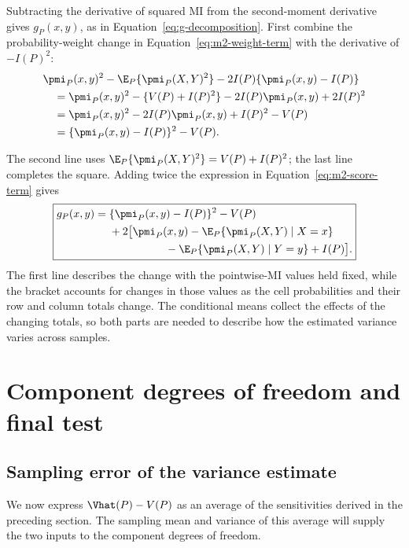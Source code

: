 Subtracting the derivative of squared MI from the second-moment derivative
gives \(g_P(x,y)\), as in Equation~\eqref{eq:g-decomposition}.
First combine the probability-weight change in
Equation~\eqref{eq:m2-weight-term} with the derivative of \(-I(P)^2\):
\begin{align*}
 &\pmi_P(x,y)^2-\E_P\{\pmi_P(X,Y)^2\}
       -2I(P)\{\pmi_P(x,y)-I(P)\}\\*
 &\quad=\pmi_P(x,y)^2-\{V(P)+I(P)^2\}
       -2I(P)\pmi_P(x,y)+2I(P)^2\\*
 &\quad=\pmi_P(x,y)^2-2I(P)\pmi_P(x,y)+I(P)^2-V(P)\\*
 &\quad=\{\pmi_P(x,y)-I(P)\}^2-V(P).
\end{align*}
\begin{samepage}%
The second line uses
\(\E_P\{\pmi_P(X,Y)^2\}=V(P)+I(P)^2\); the last line completes the
square. Adding twice the expression in Equation~\eqref{eq:m2-score-term}
gives
\begin{equation}
\boxed{
\begin{aligned}
g_P(x,y)
={}&\{\pmi_P(x,y)-I(P)\}^2-V(P)\\
&+2\bigl[
\pmi_P(x,y)
-\E_P\{\pmi_P(X,Y)\mid X=x\}\\
&\hspace{18mm}
-\E_P\{\pmi_P(X,Y)\mid Y=y\}
+I(P)
\bigr].
\end{aligned}
}
\label{eq:g-final}
\end{equation}
The first line describes the change with the pointwise-MI values held
fixed, while the bracket accounts for changes in those values as the cell
probabilities and their row and column totals change. The conditional
means collect the effects of the changing totals, so both parts are needed
to describe how the estimated variance varies across samples.
\par
\end{samepage}

\section{Component degrees of freedom and final test}
\label{sec:component-df}

\subsection{Sampling error of the variance estimate}

We now express \(\Vhat(P)-V(P)\) as an average of the sensitivities
derived in the preceding section. The sampling mean and variance of
this average will supply the two inputs to the component degrees of
freedom.

